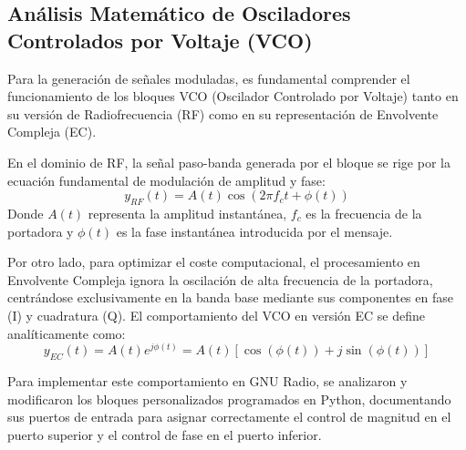 \subsection{Análisis Matemático de Osciladores Controlados por Voltaje (VCO)}
Para la generación de señales moduladas, es fundamental comprender el funcionamiento de los bloques VCO (Oscilador Controlado por Voltaje) tanto en su versión de Radiofrecuencia (RF) como en su representación de Envolvente Compleja (EC).

En el dominio de RF, la señal paso-banda generada por el bloque se rige por la ecuación fundamental de modulación de amplitud y fase:
\begin{equation}
    y_{RF}(t) = A(t) \cos(2\pi f_c t + \phi(t))
\end{equation}
Donde $A(t)$ representa la amplitud instantánea, $f_c$ es la frecuencia de la portadora y $\phi(t)$ es la fase instantánea introducida por el mensaje.

Por otro lado, para optimizar el coste computacional, el procesamiento en Envolvente Compleja ignora la oscilación de alta frecuencia de la portadora, centrándose exclusivamente en la banda base mediante sus componentes en fase (I) y cuadratura (Q). El comportamiento del VCO en versión EC se define analíticamente como:
\begin{equation}
    y_{EC}(t) = A(t) e^{j\phi(t)} = A(t)[\cos(\phi(t)) + j\sin(\phi(t))]
\end{equation}

Para implementar este comportamiento en GNU Radio, se analizaron y modificaron los bloques personalizados programados en Python, documentando sus puertos de entrada para asignar correctamente el control de magnitud en el puerto superior y el control de fase en el puerto inferior.